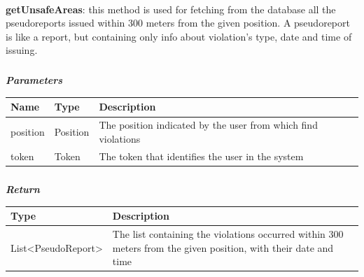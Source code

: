					\paragraph{}
							\textbf{getUnsafeAreas}: this method is used for fetching from the database all the pseudoreports issued within 300 meters from the 
given position. A pseudoreport is like a report, but containing only info about violation's type, date and time of issuing. 
							\clearpage
							\subparagraph{}
							\textit{\textbf{Parameters}}
							\vspace{-2mm}
								\begin{table}[!h]
									\begin{tabular}{L{0.2\textwidth}L{0.15\textwidth}L{0.45\textwidth}}
										\toprule
										\textbf{Name} & \textbf{Type} & \textbf{Description} \\
										\midrule
								  		position & Position & The position indicated by the user from which find violations \\
								  		token & Token & The token that identifies the user in the system \\
								 		\bottomrule
									\end{tabular}
								\end{table}
							\subparagraph{}
							\vspace{-6mm}
								\textit{\textbf{Return}}
								\vspace{-2mm}
									\begin{table}[!h]
									\begin{tabular}{L{0.3\textwidth}L{0.5\textwidth}}
										\toprule
										\textbf{Type} & \textbf{Description} \\
										\midrule
								  		List<PseudoReport> & The list containing the violations occurred within 300 meters from the given position, with their date and time \\
								 		\bottomrule
									\end{tabular}
								\end{table}
							
